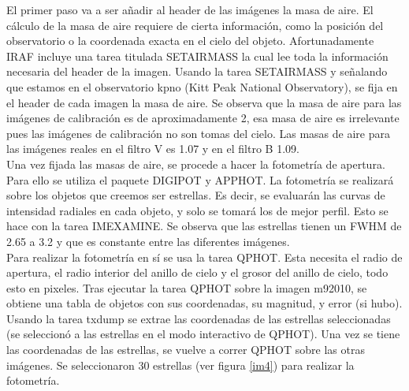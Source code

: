 \documentclass[12pt]{article}
\begin{document}
El primer paso va a ser añadir al header de las imágenes la masa de aire. El cálculo de la masa de aire requiere de cierta información, como la posición del observatorio o la coordenada exacta en el cielo del objeto. Afortunadamente IRAF incluye una tarea titulada SETAIRMASS la cual lee toda la información necesaria del header de la imagen. Usando la tarea SETAIRMASS y señalando que estamos en el observatorio kpno (Kitt Peak National Observatory), se fija en el header de cada imagen la masa de aire. Se observa que la masa de aire para las imágenes de calibración es de aproximadamente 2, esa masa de aire es irrelevante pues las imágenes de calibración no son tomas del cielo. Las masas de aire para las imágenes reales en el filtro V es 1.07 y en el filtro B 1.09.\\

Una vez fijada las masas de aire, se procede a hacer la fotometría de apertura. Para ello se utiliza el paquete DIGIPOT y APPHOT. La fotometría se realizará sobre los objetos que creemos ser estrellas. Es decir, se evaluarán las curvas de intensidad radiales en cada objeto, y solo se tomará los de mejor perfil. Esto se hace con la tarea IMEXAMINE. Se observa que las estrellas tienen un FWHM de 2.65 a 3.2 y que es constante entre las diferentes imágenes.\\

Para realizar la fotometría en sí se usa la tarea QPHOT. Esta necesita el radio de apertura, el radio interior del anillo de cielo y el grosor del anillo de cielo, todo esto en pixeles. Tras ejecutar la tarea QPHOT sobre la imagen m92010, se obtiene una tabla de objetos con sus coordenadas, su magnitud, y error (si hubo). Usando la tarea txdump se extrae las coordenadas de las estrellas seleccionadas (se seleccionó a las estrellas en el modo interactivo de QPHOT). Una vez se tiene las coordenadas de las estrellas, se vuelve a correr QPHOT sobre las otras imágenes. Se seleccionaron 30 estrellas (ver figura \ref{im4}) para realizar la fotometría.
\end{document}
